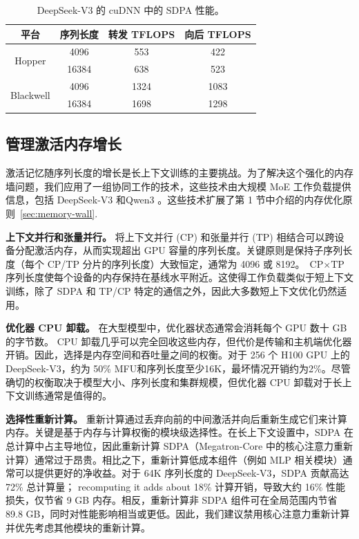 \begin{table}[ht]
\centering
\caption{DeepSeek-V3 的 cuDNN 中的 SDPA 性能。}
\label{tab:sdpa-cudnn-perf}
\begin{tabular}{cccc}
\toprule
\textbf{平台} & \textbf{序列长度} & \textbf{转发 TFLOPS} & \textbf{向后 TFLOPS} \\
\midrule
\multirow{2}{*}{Hopper}
 & 4096  & 553  & 422 \\
 & 16384 & 638  & 523 \\
\midrule
\multirow{2}{*}{Blackwell}
 & 4096  & 1324 & 1083 \\
 & 16384 & 1698 & 1298 \\
\bottomrule
\end{tabular}
\end{table}

\subsection{管理激活内存增长}

激活记忆随序列长度的增长是长上下文训练的主要挑战。为了解决这个强化的内存墙问题，我们应用了一组协同工作的技术，这些技术由大规模 MoE 工作负载提供信息，包括 DeepSeek-V3 \cite{deepseekai2025deepseekv3technicalreport} 和Qwen3 \cite{yang2025qwen3technicalreport}。这些技术扩展了第 1 节中介绍的内存优化原则~\ref{sec:memory-wall}.

\textbf{上下文并行和张量并行。}
将上下文并行 (CP) 和张量并行 (TP) 相结合可以跨设备分配激活内存，从而实现超出 GPU 容量的序列长度。关键原则是保持子序列长度（每个 CP/TP 分片的序列长度）大致恒定，通常为 4096 或 8192。 $\text{CP} \times \text{TP}$ 序列长度使每个设备的内存保持在基线水平附近。这使得工作负载类似于短上下文训练，除了 SDPA 和 TP/CP 特定的通信之外，因此大多数短上下文优化仍然适用。

\textbf{优化器 CPU 卸载。}
在大型模型中，优化器状态通常会消耗每个 GPU 数十 GB 的字节数。 CPU 卸载几乎可以完全回收这些内存，但代价是传输和主机端优化器开销。因此，选择是内存空间和吞吐量之间的权衡。对于 256 个 H100 GPU 上的 DeepSeek-V3，约为 50\% MFU和序列长度至少16K，最坏情况开销约为2\%。尽管确切的权衡取决于模型大小、序列长度和集群规模，但优化器 CPU 卸载对于长上下文训练通常是值得的。

\textbf{选择性重新计算。}
重新计算通过丢弃向前的中间激活并向后重新生成它们来计算内存。关键是基于内存与计算权衡的模块级选择性。在长上下文设置中，SDPA 在总计算中占主导地位，因此重新计算 SDPA（Megatron-Core 中的核心注意力重新计算）通常过于昂贵。相比之下，重新计算低成本组件（例如 MLP 相关模块）通常可以提供更好的净收益。对于 64K 序列长度的 DeepSeek-V3，SDPA 贡献高达 72\% 总计算量； recomputing it adds about 18\% 计算开销，导致大约 16\% 性能损失，仅节省 9 GB 内存。相反，重新计算非 SDPA 组件可在全局范围内节省 89.8 GB，同时对性能影响相当或更低。因此，我们建议禁用核心注意力重新计算并优先考虑其他模块的重新计算。

